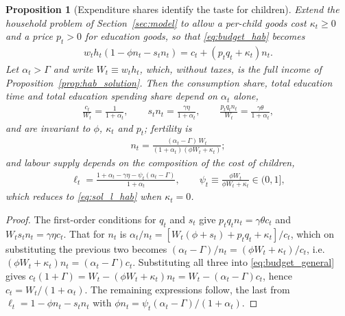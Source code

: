 \documentclass[11pt]{article}
\newtheorem{proposition}{Proposition}
\begin{document}
\begin{proposition}[Expenditure shares identify the taste for children]
\label{prop:identification}
Extend the household problem of Section~\ref{sec:model} to allow a per-child goods cost
$\kappa_t\ge 0$ and a price $p_t>0$ for education goods, so that \eqref{eq:budget_hab} becomes
\begin{align}
w_t h_t\left(1-\phi n_t-s_t n_t\right)=c_t+\left(p_t q_t+\kappa_t\right)n_t .
\label{eq:budget_general}
\end{align}
Let $\alpha_t>\Gamma$ and write $W_t\equiv w_t h_t$, which, without taxes, is the full income of
Proposition~\ref{prop:hab_solution}. Then the consumption share, total education
time and total education spending share depend on $\alpha_t$ alone,
\begin{align}
\frac{c_t}{W_t}=\frac{1}{1+\alpha_t},
\qquad
s_t n_t=\frac{\gamma\eta}{1+\alpha_t},
\qquad
\frac{p_t q_t n_t}{W_t}=\frac{\gamma\theta}{1+\alpha_t},
\label{eq:invariants}
\end{align}
and are invariant to $\phi$, $\kappa_t$ and $p_t$; fertility is
\begin{align}
n_t=\frac{(\alpha_t-\Gamma)\,W_t}{(1+\alpha_t)\left(\phi W_t+\kappa_t\right)} ;
\label{eq:n_general}
\end{align}
and labour supply depends on the \emph{composition} of the cost of children,
\begin{align}
\ell_t=\frac{1+\alpha_t-\gamma\eta-\psi_t\left(\alpha_t-\Gamma\right)}{1+\alpha_t},
\qquad
\psi_t\equiv\frac{\phi W_t}{\phi W_t+\kappa_t}\in(0,1],
\label{eq:ell_general}
\end{align}
which reduces to \eqref{eq:sol_l_hab} when $\kappa_t=0$.
\end{proposition}

\begin{proof}
The first-order conditions for $q_t$ and $s_t$ give $p_tq_tn_t=\gamma\theta c_t$ and
$W_ts_tn_t=\gamma\eta c_t$. That for $n_t$ is
$\alpha_t/n_t=\left[W_t(\phi+s_t)+p_tq_t+\kappa_t\right]/c_t$, which on substituting the previous
two becomes $(\alpha_t-\Gamma)/n_t=(\phi W_t+\kappa_t)/c_t$, i.e.
$(\phi W_t+\kappa_t)n_t=(\alpha_t-\Gamma)c_t$. Substituting all three into
\eqref{eq:budget_general} gives
$c_t(1+\Gamma)=W_t-(\phi W_t+\kappa_t)n_t=W_t-(\alpha_t-\Gamma)c_t$, hence
$c_t=W_t/(1+\alpha_t)$. The remaining expressions follow, the last from
$\ell_t=1-\phi n_t-s_tn_t$ with $\phi n_t=\psi_t(\alpha_t-\Gamma)/(1+\alpha_t)$.
\end{proof}
\end{document}
